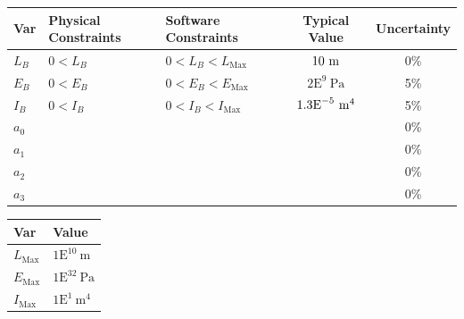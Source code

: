 \documentclass[12pt]{article}
\begin{document}
\begin{table}[H]
    \caption{Input Variables} \label{TblInputVar}
    \renewcommand{\arraystretch}{1.2}
    \noindent
    \begin{longtable}{l l l c c}
        \toprule
        \textbf{Var} & \textbf{Physical Constraints} & \textbf{Software Constraints} & \textbf{Typical Value}                            & \textbf{Uncertainty} \\
        \midrule
        $L_B$        & $0 < L_B$                     & $0 < L_B < L_\text{Max}$      & $10~\si[per-mode=symbol]{\metre}$                 & 0\%                  \\
        $E_B$        & $0 < E_B$                     & $0 < E_B < E_\text{Max}$      & $2\text{E}^9~\si{\pascal}$                        & 5\%                  \\
        $I_B$        & $0 < I_B$                     & $0 < I_B < I_\text{Max}$      & $1.3\text{E}^{-5}~\si[per-mode=symbol]{\metre}^4$ & 5\%                  \\
        $a_0$        & \textemdash{}                 & \textemdash{}                 & \textemdash{}                                     & 0\%                  \\
        $a_1$        & \textemdash{}                 & \textemdash{}                 & \textemdash{}                                     & 0\%                  \\
        $a_2$        & \textemdash{}                 & \textemdash{}                 & \textemdash{}                                     & 0\%                  \\
        $a_3$        & \textemdash{}                 & \textemdash{}                 & \textemdash{}                                     & 0\%                  \\
        \bottomrule
    \end{longtable}
\end{table}

\begin{table}[H]
    \caption{Specification Parameter Values} \label{TblSpecParams}
    \renewcommand{\arraystretch}{1.2}
    \noindent \begin{longtable}{l l}
        \toprule
        \textbf{Var}   & \textbf{Value}                \\
        \midrule
        $L_\text{Max}$ & $1\text{E}^{10}~\si{\metre}$  \\
        $E_\text{Max}$ & $1\text{E}^{32}~\si{\pascal}$ \\
        $I_\text{Max}$ & $1\text{E}^{1}~\si{\metre}^4$ \\
        \bottomrule
    \end{longtable}
\end{table}
\end{document}
